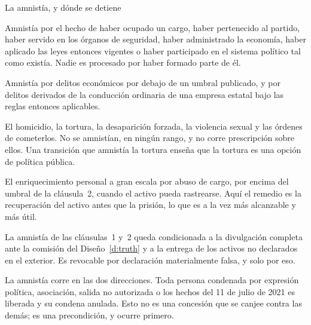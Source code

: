 \begin{design}{La amnistía, y dónde se detiene}
\label{d:amnesty}
\begin{rules}
 Amnistía por el hecho de haber ocupado un cargo, haber pertenecido
al partido, haber servido en los órganos de seguridad, haber administrado la
economía, haber aplicado las leyes entonces vigentes o haber participado en el
sistema político tal como existía. Nadie es procesado por haber formado parte de él.

 Amnistía por delitos económicos por debajo de un umbral publicado,
y por delitos derivados de la conducción ordinaria de una empresa estatal bajo las
reglas entonces aplicables.

 El homicidio, la tortura, la desaparición forzada, la violencia
sexual y las órdenes de cometerlos. No se amnistían, en ningún rango, y no corre
prescripción sobre ellos. Una transición que amnistía la tortura enseña que la
tortura es una opción de política pública.

 El enriquecimiento personal a gran escala por abuso de cargo, por
encima del umbral de la cláusula~2, cuando el activo pueda rastrearse. Aquí el
remedio es la recuperación del activo antes que la prisión, lo que es a la vez más
alcanzable y más útil.

 La amnistía de las cláusulas~1 y~2 queda condicionada a la
divulgación completa ante la comisión del Diseño~\ref{d:truth} y a la entrega de los
activos no declarados en el exterior. Es revocable por declaración materialmente
falsa, y solo por eso.

 La amnistía corre en las dos direcciones. Toda persona condenada
por expresión política, asociación, salida no autorizada o los hechos del 11 de
julio de 2021 es liberada y su condena anulada. Esto no es una concesión que se
canjee contra las demás; es una precondición, y ocurre primero.
\end{rules}
\end{design}


